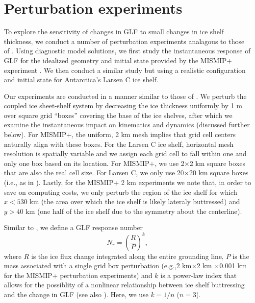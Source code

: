 \documentclass[review,oneside]{igs}
\begin{document}
\section{Perturbation experiments}

To explore the sensitivity of changes in GLF to small changes in ice shelf thickness, we conduct a number of perturbation experiments analagous to those of \citet{reese2018}. Using diagnostic model solutions, we first study the instantaneous response of GLF for the idealized geometry and initial state provided by the MISMIP+ experiment \citep{asay2016}. We then conduct a similar study but using a realistic configuration and initial state for Antarctica's Larsen C ice shelf. %

Our experiments are conducted in a manner similar to those of \cite{reese2018}. We perturb the coupled ice sheet-shelf system by decreasing the ice thickness uniformly by 1 m over square grid ``boxes'' covering the base of the ice shelves, after which we examine the instantaneous impact on kinematics and dynamics (discussed further below). For MISMIP+, the uniform, 2 km mesh implies that grid cell centers naturally align with these boxes. For the Larsen C ice shelf, horizontal mesh resolution is spatially variable and we assign each grid cell to fall within one and only one box based on its location. For MISMIP+, we use 2$\times$2 km square boxes that are also the real cell size. For Larsen C, we only use 20$\times$20 km square boxes (i.e., as in \citet{reese2018}). Lastly, for the MISMIP+ 2 km experiments we note that, in order to save on computing costs, we only perturb the region of the ice shelf for which $x<530$ km (the area over which the ice shelf is likely lateraly buttressed) and $y>40$ km (one half of the ice shelf due to the symmetry about the centerline).

Similar to \cite{reese2018}, we define a GLF response number
\begin{equation}
N_r = \left(\frac{R}{P}\right)^k,
\end{equation}
where $R$ is the ice flux change integrated along the entire grounding line, $P$ is the mass associated with a single grid box perturbation (e.g.,2 km$\times$2 km $\times$0.001 km for the MISMIP+ perturbation experiments) and $k$ is a power-law index that allows for the possiblity of a nonlinear relationship between ice shelf buttressing and the change in GLF (see also \cite{schoof2007}). Here, we use $k=1/n$ ($n=3$).
\end{document}
